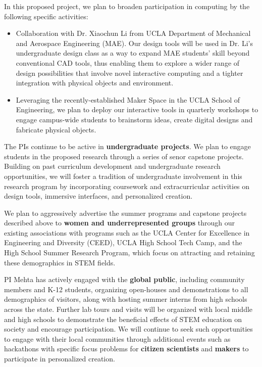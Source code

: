 In this proposed project, we plan to broaden participation in computing by the following specific activities:
\begin{itemize}
	\item Collaboration with Dr. Xiaochun Li from UCLA Department of Mechanical and Aerospace Engineering (MAE). Our design tools will be used in Dr. Li's undergraduate design class as a way to expand MAE students' skill beyond conventional CAD tools, thus enabling them to explore a wider range of design possibilities that involve novel interactive computing and a tighter integration with physical objects and environment.
	\item Leveraging the recently-established Maker Space in the UCLA School of Engineering, we plan to deploy our interactive tools in quarterly workshops to engage campus-wide students to brainstorm ideas, create digital designs and fabricate physical objects.
\end{itemize}
 

The PIs continue to be active in \textbf{undergraduate projects}.
We plan to engage students in the proposed research through a series of senor capstone projects. 
Building on past curriculum development and undergraduate research opportunities, we will foster a tradition of undergraduate involvement in this research program by incorporating coursework and extracurricular activities on design tools, immersive interfaces, and personalized creation.

We plan to aggressively advertise the summer programs and capstone projects described above to \textbf{women and underrepresented groups} through our existing associations with programs such as the UCLA Center for Excellence in Engineering and Diversity (CEED), UCLA High School Tech Camp, and the High School Summer Research Program, which focus on attracting and retaining these demographics in STEM fields.

PI Mehta has actively engaged with the \textbf{global public}, including community members and K-12 students, organizing open-houses and demonstrations to all demographics of visitors, along with hosting summer interns from high schools across the state.  Further lab tours and visits will be organized with local middle and high schools to demonstrate the beneficial effects of STEM education on society and encourage participation.  We will continue to seek such opportunities to engage with their local communities through additional events such as hackathons with specific focus problems for \textbf{citizen scientists} and \textbf{makers} to participate in personalized creation.  %

